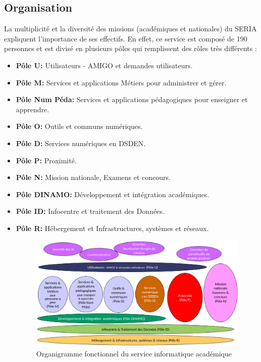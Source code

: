 \documentclass[12pt]{article}
\begin{document}
\subsection{Organisation}

La multiplicité et la diversité des missions (académiques et nationales) du SERIA expliquent l’importance de ses effectifs. En effet, ce service est composé de 190 personnes et est divisé en plusieurs pôles qui remplissent des rôles très différents :
\begin{itemize}
\item \textbf{Pôle U: } Utilisateurs - AMIGO et demandes utilisateurs.
\item \textbf{Pôle M: } Services et applications Métiers pour administrer et gérer.
\item \textbf{Pôle Num Péda: } Services et applications pédagogiques pour enseigner et apprendre.
\item \textbf{Pôle O: } Outils et communs numériques.
\item \textbf{Pôle D: } Services numériques en DSDEN.
\item \textbf{Pôle P: } Proximité.	
\item \textbf{Pôle N: } Mission nationale, Examens et concours.
\item \textbf{Pôle DINAMO: } Développement et intégration académiques.
\item \textbf{Pôle ID: } Infocentre et traitement des Données.
\item \textbf{Pôle R: } Hébergement et Infrastructures, systèmes et réseaux.


\begin{figure}[H]
	\centering
 		\includegraphics[width=1\textwidth]{diagrammes/organigramme_DSII.png}
  		\caption{Organigramme fonctionnel du service informatique académique}
	\end{figure}

\end{itemize}
\end{document}
